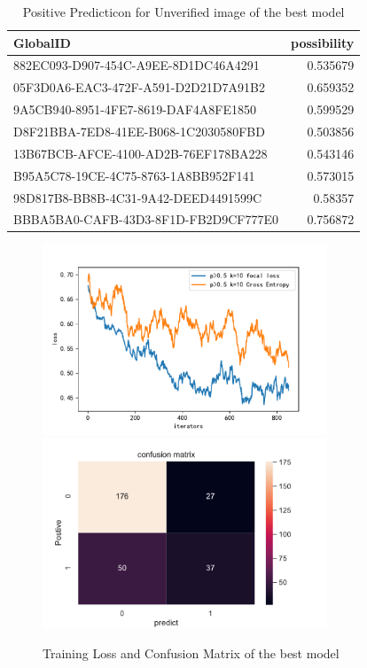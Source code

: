 \documentclass[12pt]{article}
\begin{document}
\begin{table}[htbp]
	\centering
	\caption{Positive Predicticon for Unverified image of the best model}
	  \begin{tabular}{lr}
	  \toprule
	  GlobalID & \multicolumn{1}{l}{possibility} \\
	  \midrule
	  {882EC093-D907-454C-A9EE-8D1DC46A4291} & 0.535679 \\
	  \rowcolor{mygray}
	  {05F3D0A6-EAC3-472F-A591-D2D21D7A91B2} & 0.659352 \\
	  {9A5CB940-8951-4FE7-8619-DAF4A8FE1850} & 0.599529 \\
	  \rowcolor{mygray}
	  {D8F21BBA-7ED8-41EE-B068-1C2030580FBD} & 0.503856 \\
	  {13B67BCB-AFCE-4100-AD2B-76EF178BA228} & 0.543146 \\
	  \rowcolor{mygray}
	  {B95A5C78-19CE-4C75-8763-1A8BB952F141} & 0.573015 \\
	  {98D817B8-BB8B-4C31-9A42-DEED4491599C} & 0.58357 \\
	  \rowcolor{mygray}
	  {BBBA5BA0-CAFB-43D3-8F1D-FB2D9CF777E0} & 0.756872 \\
	  \bottomrule
	  \end{tabular}%
	\label{Positive_Predicticon}%
  \end{table}%
  
\begin{figure}[H]%
	\small
	\centering
	\includegraphics[width=8.5cm]{./pictures/focal_loss}
	\includegraphics[width=8.5cm]{./pictures/confusion_matrix}
	\caption{Training Loss and Confusion Matrix of the best model}\label{confusion_matrix}
\end{figure}
\end{document}
